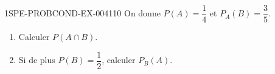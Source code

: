 \begin{exercice}{1SPE-PROBCOND-EX-004}{1}{10}
On donne $P(A) = \dfrac{1}{4}$ et $P_A(B) = \dfrac{3}{5}$.

\begin{enumerate}
  \item Calculer $P(A \cap B)$.
  \item Si de plus $P(B) = \dfrac{1}{2}$, calculer $P_B(A)$.
\end{enumerate}
\end{exercice}
